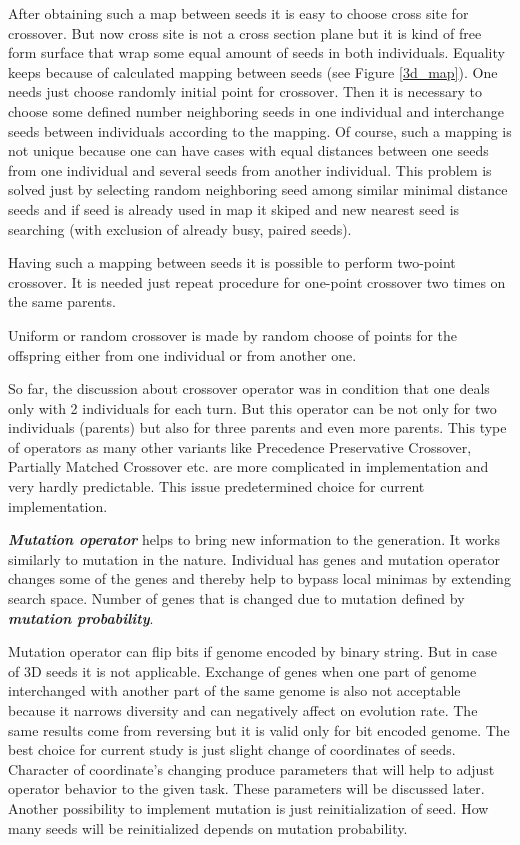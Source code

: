 \documentclass[12pt]{report}
\begin{document}
After obtaining such a map between seeds it is easy to choose cross site for crossover. But now cross site is not a cross section plane but it is kind of free form surface that wrap some equal amount of seeds in both individuals. Equality keeps because of calculated mapping between seeds (see Figure \ref{3d_map}). One needs just choose randomly initial point for crossover. Then it is necessary to choose some defined number neighboring seeds in one individual and interchange seeds between individuals according to the mapping. Of course, such a mapping is not unique because one can have cases with equal distances between one seeds from one individual and several seeds from another individual. This problem is solved just by selecting random neighboring seed among similar minimal distance seeds and if seed is already used in map it skiped and new nearest seed is searching (with exclusion of already busy, paired seeds).

Having such a mapping between seeds it is possible to perform two-point crossover. It is needed just repeat procedure for one-point crossover two times on the same parents.

Uniform or random crossover is made by random choose of points for the offspring either from one individual or from another one.

So far, the discussion about crossover operator was in condition that one deals only with 2 individuals for each turn. But this operator can be not only for two individuals (parents) but also for three parents and even more parents. This type of operators as many other variants like Precedence Preservative Crossover, Partially Matched Crossover etc. are more complicated in implementation and very hardly predictable. This issue predetermined choice for current implementation.

\textit{\textbf{Mutation operator}} helps to bring new information to the generation. It works similarly to mutation in the nature. Individual has genes and mutation operator changes some of the genes and thereby help to bypass local minimas by extending search space. Number of genes that is changed due to mutation defined by \textit{\textbf{mutation probability}}.

Mutation operator can flip bits if genome encoded by binary string. But in case of 3D seeds it is not applicable. Exchange of genes when one part of genome interchanged with another part of the same genome is also not acceptable because it narrows diversity and can negatively affect on evolution rate. The same results come from reversing but it is valid only for bit encoded genome. The best choice for current study is just slight change of coordinates of seeds. Character of coordinate's changing produce parameters that will help to adjust operator behavior to the given task. These parameters will be discussed later. Another possibility to implement mutation is just reinitialization of seed. How many seeds will be reinitialized depends on mutation probability.
\end{document}
